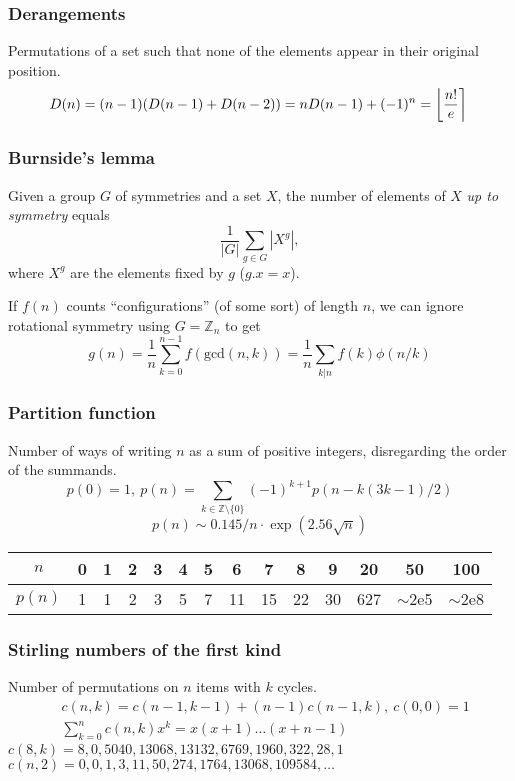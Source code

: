 \begin{small}
  \subsubsection{Derangements}
    Permutations of a set such that none of the elements appear in their original position.
    \[ \mkern-2mu D(n) = (n-1)(D(n-1)+D(n-2)) = n D(n-1)+(-1)^n = \left\lfloor\frac{n!}{e}\right\rceil \]

  \subsubsection{Burnside's lemma}
    Given a group $G$ of symmetries and a set $X$, the number of elements of $X$ \emph{up to symmetry} equals
     \[ {\frac {1}{|G|}}\sum _{{g\in G}}|X^{g}|, \]
     where $X^{g}$ are the elements fixed by $g$ ($g.x = x$).

     If $f(n)$ counts ``configurations'' (of some sort) of length $n$, we can ignore rotational symmetry using $G = \mathbb Z_n$ to get
     \[ g(n) = \frac 1 n \sum_{k=0}^{n-1}{f(\text{gcd}(n, k))} = \frac 1 n \sum_{k|n}{f(k)\phi(n/k)} \]

  \subsubsection{Partition function}
    Number of ways of writing $n$ as a sum of positive integers, disregarding the order of the summands.
    \[ p(0) = 1,\ p(n) = \sum_{k \in \mathbb Z \setminus \{0\}}{(-1)^{k+1} p(n - k(3k-1) / 2)} \]
    \[ p(n) \sim 0.145 / n \cdot \exp(2.56 \sqrt{n}) \]

    \begin{center}
    \begin{tabular}{c|c@{\ }c@{\ }c@{\ }c@{\ }c@{\ }c@{\ }c@{\ }c@{\ }c@{\ }c@{\ }c@{\ }c@{\ }c}
      $n$    & 0 & 1 & 2 & 3 & 4 & 5 & 6  & 7  & 8  & 9  & 20  & 50  & 100 \\ \hline
      $p(n)$ & 1 & 1 & 2 & 3 & 5 & 7 & 11 & 15 & 22 & 30 & 627 & $\mathtt{\sim}$2e5 & $\mathtt{\sim}$2e8 \\
    \end{tabular}
    \end{center}

  \subsubsection{Stirling numbers of the first kind}
    Number of permutations on $n$ items with $k$ cycles.
    \begin{align*}
      &c(n,k) = c(n-1,k-1) + (n-1) c(n-1,k),\ c(0,0) = 1 \\
      &\textstyle \sum_{k=0}^n c(n,k)x^k = x(x+1) \dots (x+n-1)
    \end{align*}
    $c(8,k) = 8, 0, 5040, 13068, 13132, 6769, 1960, 322, 28, 1$ \\
    $c(n,2) = 0, 0, 1, 3, 11, 50, 274, 1764, 13068, 109584, \dots$


\end{small}
